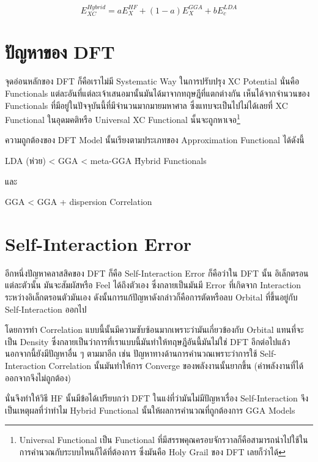 \begin{equation}
    E^{Hybrid}_{XC} = a E^{HF}_{X} + (1 - a) E^{GGA}_{X} + b E^{LDA}_{c}
\end{equation}

\section{ปัญหาของ DFT}

จุดอ่อนหลักของ DFT ก็คือเราไม่มี Systematic Way ในการปรับปรุง XC Potential นั่นคือ Functionals 
แต่ละอันที่แต่ละเจ้าเสนอมานั้นมันได้มาจากทฤษฎีที่แตกต่างกัน เห็นได้จากจำนวนของ Functionals 
ที่มีอยู่ในปัจจุบันนี้ที่มีจำนวนมากมายมหาศาล ซึ่งแทบจะเป็นไปไม่ได้เลยที่ XC Functional ในอุดมคติหรือ 
Universal XC Functional นั้นจะถูกหาเจอ\footnote{Universal Functional เป็น Functional 
ที่มีสรรพคุณครอบจักรวาลก็คือสามารถนำไปใช้ในการคำนวณกับระบบไหนก็ได้ที่ต้องการ ซึ่งมันคือ Holy Grail 
ของ DFT เลยก็ว่าได้}

ความถูกต้องของ DFT Model นั้นเรียงตามประเภทของ Approximation Functional ได้ดังนี้ 

LDA (ห่วย) < GGA < meta-GGA \~ Hybrid Functionals 

\noindent และ 

GGA < GGA + dispersion Correlation 

\section{Self-Interaction Error}

อีกหนึ่งปัญหาคลาสสิคของ DFT ก็คือ Self-Interaction Error ก็คือว่าใน DFT นั้น อิเล็กตรอนแต่ละตัวนั้น%
มันจะสัมผัสหรือ Feel ได้ถึงตัวเอง ซึ่งกลายเป็นมันมี Error ที่เกิดจาก Interaction ระหว่างอิเล็กตรอนตัวมันเอง 
ดังนั้นการแก้ปัญหาดังกล่าวก็คือการตัดหรือลบ Orbital ที่ขึ้นอยู่กับ Self-Interaction ออกไป 

โดยการทำ Correlation แบบนี้นั้นมีความซับซ้อนมากเพราะว่ามันเกี่ยวข้องกับ Orbital แทนที่จะเป็น Density 
ซึ่งกลายเป็นว่าการที่เราแบบนี้มันทำให้ทฤษฎีอันนี้มันไม่ใช่ DFT อีกต่อไปแล้ว นอกจากนี้ยังมีปัญหาอื่น ๆ ตามมาอีก เช่น 
ปัญหาทางด้านการคำนวณเพราะว่าการใช้ Self-Interaction Correlation นั้นมันทำให้การ Converge 
ของพลังงานนั้นยากขึ้น (ค่าพลังงานที่ได้ออกจากจึงไม่ถูกต้อง)

นั่นจึงทำให้วิธี HF นั้นมีข้อได้เปรียบกว่า DFT ในแง่ที่ว่ามันไม่มีปัญหาเรื่อง Self-Interaction จึงเป็นเหตุผลที่ว่าทำไม 
Hybrid Functional นั้นให้ผลการคำนวณที่ถูกต้องการ GGA Models 

